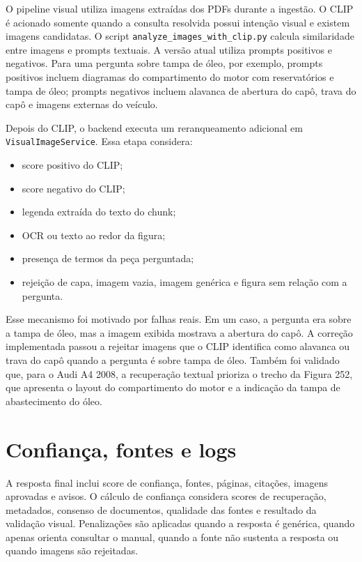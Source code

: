 O pipeline visual utiliza imagens extraídas dos PDFs durante a ingestão. O CLIP é acionado somente quando a consulta resolvida possui intenção visual e existem imagens candidatas. O script \texttt{analyze\_images\_with\_clip.py} calcula similaridade entre imagens e prompts textuais. A versão atual utiliza prompts positivos e negativos. Para uma pergunta sobre tampa de óleo, por exemplo, prompts positivos incluem diagramas do compartimento do motor com reservatórios e tampa de óleo; prompts negativos incluem alavanca de abertura do capô, trava do capô e imagens externas do veículo.

Depois do CLIP, o backend executa um reranqueamento adicional em \texttt{VisualImageService}. Essa etapa considera:

\begin{itemize}
  \item score positivo do CLIP;
  \item score negativo do CLIP;
  \item legenda extraída do texto do chunk;
  \item OCR ou texto ao redor da figura;
  \item presença de termos da peça perguntada;
  \item rejeição de capa, imagem vazia, imagem genérica e figura sem relação com a pergunta.
\end{itemize}

Esse mecanismo foi motivado por falhas reais. Em um caso, a pergunta era sobre a tampa de óleo, mas a imagem exibida mostrava a abertura do capô. A correção implementada passou a rejeitar imagens que o CLIP identifica como alavanca ou trava do capô quando a pergunta é sobre tampa de óleo. Também foi validado que, para o Audi A4 2008, a recuperação textual prioriza o trecho da Figura 252, que apresenta o layout do compartimento do motor e a indicação da tampa de abastecimento do óleo.

\section{Confiança, fontes e logs}

A resposta final inclui score de confiança, fontes, páginas, citações, imagens aprovadas e avisos. O cálculo de confiança considera scores de recuperação, metadados, consenso de documentos, qualidade das fontes e resultado da validação visual. Penalizações são aplicadas quando a resposta é genérica, quando apenas orienta consultar o manual, quando a fonte não sustenta a resposta ou quando imagens são rejeitadas.

